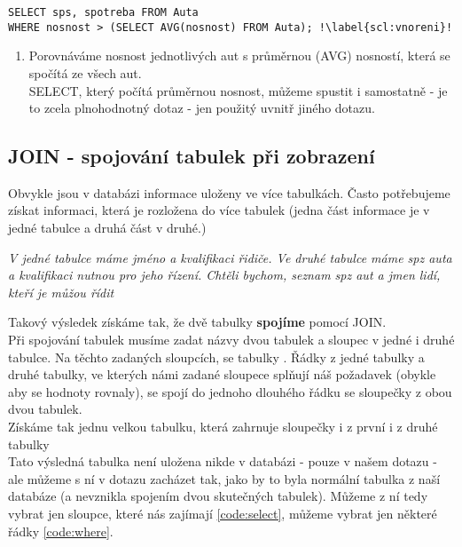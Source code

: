 \begin{minipage}[t]{.45\textwidth}
\begin{code}
\begin{verbatim}
SELECT sps, spotreba FROM Auta
WHERE nosnost > (SELECT AVG(nosnost) FROM Auta); !\label{scl:vnoreni}!
\end{verbatim}
\label{code:vnoreni}
\end{code}
\end{minipage}
\begin{minipage}[t]{.45\textwidth}
\vspace{1.7cm}
\begin{enumerate}
\item[ř. \ref{scl:vnoreni}:] Porovnáváme nosnost jednotlivých aut s průměrnou (AVG) nosností, která se spočítá ze všech aut.\\ SELECT, který počítá průměrnou nosnost, můžeme spustit i samostatně - je to zcela plnohodnotný dotaz - jen použitý uvnitř jiného dotazu.
\end{enumerate}
\end{minipage}

\subsection{JOIN - spojování tabulek při zobrazení}

Obvykle jsou v databázi informace uloženy ve více tabulkách. Často potřebujeme získat informaci, která je rozložena do více tabulek (jedna část informace je v jedné tabulce a druhá část v druhé.)

\vspace{1cm}
\textit{V jedné tabulce máme jméno a kvalifikaci řidiče. Ve druhé tabulce máme spz auta a kvalifikaci nutnou pro jeho řízení. Chtěli bychom, seznam spz aut a jmen lidí, kteří je můžou řídit}
\vspace{1cm}

Takový výsledek získáme tak, že dvě tabulky \textbf{spojíme} pomocí JOIN.\\
Při spojování tabulek musíme zadat názvy dvou tabulek a sloupec v jedné i druhé tabulce. Na těchto zadaných sloupcích, se tabulky . Řádky z jedné tabulky a druhé tabulky, ve kterých námi zadané sloupece splňují náš požadavek (obykle aby se hodnoty rovnaly), se spojí do jednoho dlouhého řádku se sloupečky z obou dvou tabulek.\\
Získáme tak jednu velkou tabulku, která zahrnuje sloupečky i z první i z druhé tabulky\\
Tato výsledná tabulka není uložena nikde v databázi -  pouze v našem dotazu - ale můžeme s ní v dotazu zacházet tak, jako by to byla normální tabulka z naší databáze (a nevznikla spojením dvou skutečných tabulek). Můžeme z ní tedy vybrat jen sloupce, které nás zajímají \ref{code:select}, můžeme vybrat jen některé řádky \ref{code:where}.\\


